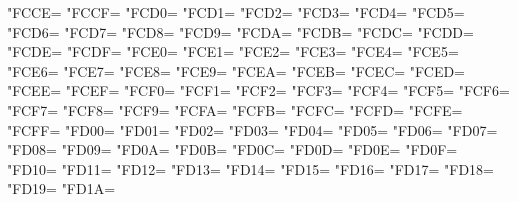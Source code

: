 \XeTeXcharclass"FCCE=\KclassArabU
\XeTeXcharclass"FCCF=\KclassArabU
\XeTeXcharclass"FCD0=\KclassArabU
\XeTeXcharclass"FCD1=\KclassArabU
\XeTeXcharclass"FCD2=\KclassArabU
\XeTeXcharclass"FCD3=\KclassArabU
\XeTeXcharclass"FCD4=\KclassArabU
\XeTeXcharclass"FCD5=\KclassArabU
\XeTeXcharclass"FCD6=\KclassArabU
\XeTeXcharclass"FCD7=\KclassArabU
\XeTeXcharclass"FCD8=\KclassArabU
\XeTeXcharclass"FCD9=\KclassArabU
\XeTeXcharclass"FCDA=\KclassArabU
\XeTeXcharclass"FCDB=\KclassArabU
\XeTeXcharclass"FCDC=\KclassArabU
\XeTeXcharclass"FCDD=\KclassArabU
\XeTeXcharclass"FCDE=\KclassArabU
\XeTeXcharclass"FCDF=\KclassArabU
\XeTeXcharclass"FCE0=\KclassArabU
\XeTeXcharclass"FCE1=\KclassArabU
\XeTeXcharclass"FCE2=\KclassArabU
\XeTeXcharclass"FCE3=\KclassArabU
\XeTeXcharclass"FCE4=\KclassArabU
\XeTeXcharclass"FCE5=\KclassArabU
\XeTeXcharclass"FCE6=\KclassArabU
\XeTeXcharclass"FCE7=\KclassArabU
\XeTeXcharclass"FCE8=\KclassArabU
\XeTeXcharclass"FCE9=\KclassArabU
\XeTeXcharclass"FCEA=\KclassArabU
\XeTeXcharclass"FCEB=\KclassArabU
\XeTeXcharclass"FCEC=\KclassArabU
\XeTeXcharclass"FCED=\KclassArabU
\XeTeXcharclass"FCEE=\KclassArabU
\XeTeXcharclass"FCEF=\KclassArabU
\XeTeXcharclass"FCF0=\KclassArabU
\XeTeXcharclass"FCF1=\KclassArabU
\XeTeXcharclass"FCF2=\KclassArabU
\XeTeXcharclass"FCF3=\KclassArabU
\XeTeXcharclass"FCF4=\KclassArabU
\XeTeXcharclass"FCF5=\KclassArabU
\XeTeXcharclass"FCF6=\KclassArabU
\XeTeXcharclass"FCF7=\KclassArabU
\XeTeXcharclass"FCF8=\KclassArabU
\XeTeXcharclass"FCF9=\KclassArabU
\XeTeXcharclass"FCFA=\KclassArabU
\XeTeXcharclass"FCFB=\KclassArabU
\XeTeXcharclass"FCFC=\KclassArabU
\XeTeXcharclass"FCFD=\KclassArabU
\XeTeXcharclass"FCFE=\KclassArabU
\XeTeXcharclass"FCFF=\KclassArabU
\XeTeXcharclass"FD00=\KclassArabU
\XeTeXcharclass"FD01=\KclassArabU
\XeTeXcharclass"FD02=\KclassArabU
\XeTeXcharclass"FD03=\KclassArabU
\XeTeXcharclass"FD04=\KclassArabU
\XeTeXcharclass"FD05=\KclassArabU
\XeTeXcharclass"FD06=\KclassArabU
\XeTeXcharclass"FD07=\KclassArabU
\XeTeXcharclass"FD08=\KclassArabU
\XeTeXcharclass"FD09=\KclassArabU
\XeTeXcharclass"FD0A=\KclassArabU
\XeTeXcharclass"FD0B=\KclassArabU
\XeTeXcharclass"FD0C=\KclassArabU
\XeTeXcharclass"FD0D=\KclassArabU
\XeTeXcharclass"FD0E=\KclassArabU
\XeTeXcharclass"FD0F=\KclassArabU
\XeTeXcharclass"FD10=\KclassArabU
\XeTeXcharclass"FD11=\KclassArabU
\XeTeXcharclass"FD12=\KclassArabU
\XeTeXcharclass"FD13=\KclassArabU
\XeTeXcharclass"FD14=\KclassArabU
\XeTeXcharclass"FD15=\KclassArabU
\XeTeXcharclass"FD16=\KclassArabU
\XeTeXcharclass"FD17=\KclassArabU
\XeTeXcharclass"FD18=\KclassArabU
\XeTeXcharclass"FD19=\KclassArabU
\XeTeXcharclass"FD1A=\KclassArabU
